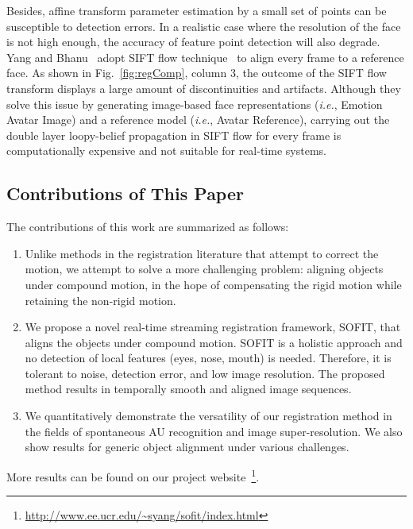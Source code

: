 \documentclass[10pt,journal]{IEEEtran}
\begin{document}
Besides, affine transform parameter estimation by a small set of points can be susceptible to detection errors. In a realistic case where the resolution of the face is not high enough, the accuracy of feature point detection will also degrade. Yang and Bhanu~\cite{Yang_SMCB12} adopt SIFT flow technique~\cite{Liu_PAMI11} to align every frame to a reference face. As shown in Fig.~\ref{fig:regComp}, column 3, the outcome of the SIFT flow transform displays a large amount of discontinuities and artifacts. Although they solve this issue by generating image-based face representations (\textit{i.e.}, Emotion Avatar Image) and a reference model (\textit{i.e.}, Avatar Reference), carrying out the double layer loopy-belief propagation in SIFT flow for every frame is computationally expensive and not suitable for real-time systems.

\subsection{\label{sec:contribution}Contributions of This Paper}

The contributions of this work are summarized as follows:

\begin{enumerate}
\item Unlike methods in the registration literature that attempt to correct the motion, we attempt to solve a more challenging problem: aligning objects under compound motion, in the hope of compensating the rigid motion while retaining the non-rigid motion.
\item We propose a novel real-time streaming registration framework, SOFIT, that aligns the objects under compound motion. SOFIT is a holistic approach and no detection of local features (eyes, nose, mouth) is needed. Therefore, it is tolerant to noise, detection error, and low image resolution. The proposed method results in temporally smooth and aligned image sequences.
\item We quantitatively demonstrate the versatility of our registration method in the fields of spontaneous AU recognition and image super-resolution. We also show results for generic object alignment under various challenges.
\end{enumerate}

More results can be found on our project website~\footnote{\url{http://www.ee.ucr.edu/~syang/sofit/index.html}}.

\end{document}
